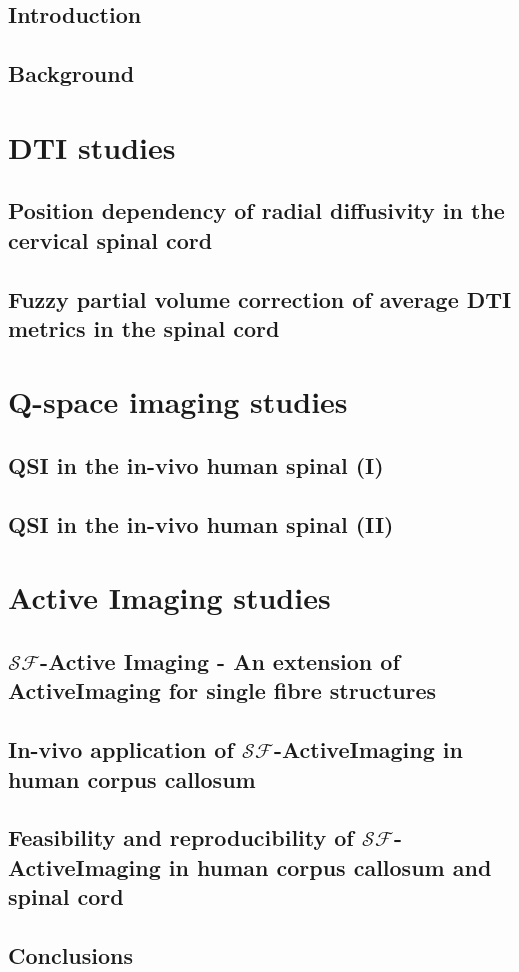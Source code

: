 \documentclass[a4paper,final]{book}
\newcommand{\SF}{{\ensuremath{\mathcal{SF}}}}
\begin{document}
\setcounter{tocdepth}{1}
\tableofcontents

\chapter{Introduction}

\chapter{Background}
%
\part{DTI studies}
\label{part1}
%
\chapter[Position dependency of radial diffusivity]{Position dependency of radial diffusivity in the cervical spinal cord}
\label{chapter3}
%
\chapter[Fuzzy partial volume correction]{Fuzzy partial volume correction of average DTI metrics in the spinal cord}
\label{chapter4}
\part{Q-space imaging studies}
\label{part2}
%
\chapter{QSI in the in-vivo human spinal (I) }
\label{chapter5}
\chapter{QSI in the in-vivo human spinal (II) }
\label{chapter6}
%
\part{Active Imaging studies}
\label{part3}
\chapter{\SF-Active Imaging - An extension of ActiveImaging for single fibre structures}
\label{chapter7}
%
\chapter{In-vivo application of {\SF}-ActiveImaging in human corpus callosum}
\label{chapter8}
%
\chapter{Feasibility and reproducibility of {\SF}-ActiveImaging in human corpus callosum and spinal cord}
\label{chapter9}
%
\chapter{Conclusions}


%


\end{document}
